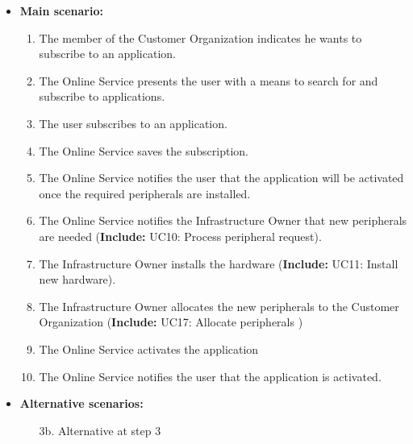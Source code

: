 \documentclass[english,peerreview]{sareport}
\begin{document}
\begin{itemize}
        
    \item \textbf{Main scenario:} 
    \begin{enumerate}
       \item The member of the Customer Organization indicates he wants to subscribe to an application.
       \item The Online Service presents the user with a means to search for and subscribe to applications.
       \item The user subscribes to an application.
	\item The Online Service saves the subscription.
	\item The Online Service notifies the user that the application will be activated once the required peripherals are installed.
	\item The Online Service notifies the Infrastructure Owner that new peripherals are needed (\textbf{Include:} UC10: Process peripheral request).
	\item The Infrastructure Owner installs the hardware (\textbf{Include:} UC11: Install new hardware).
    \item The Infrastructure Owner allocates the new peripherals to the Customer Organization (\textbf{Include:} UC17: Allocate peripherals )
	\item The Online Service activates the application
	\item The Online Service notifies the user that the application is activated.
    \end{enumerate}

    \item \textbf{Alternative scenarios:} 
    \begin{enumerate}
        \item [3b.] Alternative at step 3
    \end{enumerate}
\end{itemize}
\end{document}
